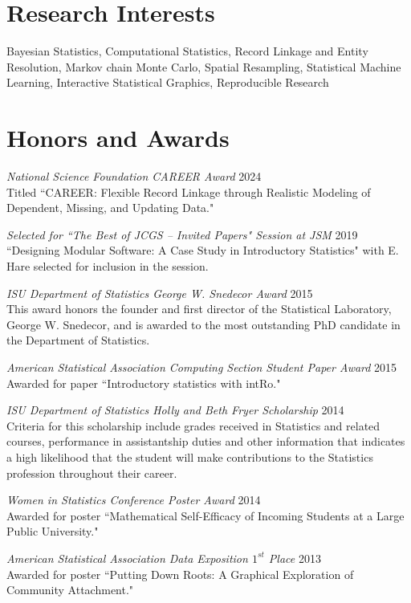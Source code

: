 \documentclass[margin,line]{res}
\begin{document}
\begin{resume}
\section{\sc Research Interests}
Bayesian Statistics, Computational Statistics, Record Linkage and Entity Resolution, Markov chain Monte Carlo, Spatial Resampling, Statistical Machine Learning, Interactive Statistical Graphics, Reproducible Research

\section{\sc Honors and Awards}
{\em National Science Foundation CAREER Award } \hfill 2024 \\
Titled ``CAREER: Flexible Record Linkage through Realistic Modeling of Dependent, Missing, and Updating Data."

{\em Selected for ``The Best of JCGS -- Invited Papers" Session at JSM } \hfill 2019\\
``Designing Modular Software: A Case Study in Introductory Statistics" with E. Hare selected for inclusion in the session.

{\em ISU Department of Statistics George W. Snedecor Award } \hfill 2015\\
This award honors the founder and first director of the Statistical Laboratory, George W. Snedecor, and is awarded to the most outstanding PhD candidate in the Department of Statistics.

{\em American Statistical Association Computing Section Student Paper Award } \hfill 2015 \\
Awarded for paper ``Introductory statistics with intRo."

{\em ISU Department of Statistics Holly and Beth Fryer Scholarship } \hfill 2014\\
Criteria for this scholarship include grades received in Statistics and related courses, performance in assistantship duties and other information that indicates a high likelihood that the student will make contributions to the Statistics profession throughout their career.

{\em Women in Statistics Conference Poster Award } \hfill 2014\\
Awarded for poster ``Mathematical Self-Efficacy of Incoming Students at a Large Public University."

{\em American Statistical Association Data Exposition $1^{st}$ Place } \hfill 2013\\
Awarded for poster ``Putting Down Roots: A Graphical Exploration of Community Attachment."


\end{resume}
\end{document}
